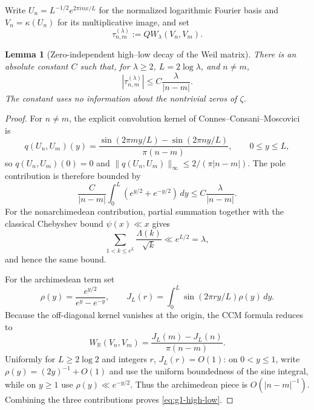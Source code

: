 \documentclass[11pt]{article}
\newtheorem{lemma}[theorem]{Lemma}
\theoremstyle{remark}
\begin{document}
Write $U_n=L^{-1/2}e^{2\pi inx/L}$ for the normalized logarithmic Fourier basis and $V_n=\kappa(U_n)$ for its multiplicative image, and set
\[
 \tau^{(\lambda)}_{n,m}:=QW_\lambda(V_n,V_m).
\]

\begin{lemma}[Zero-independent high--low decay of the Weil matrix]\label{lem:g1-high-low}
There is an absolute constant $C$ such that, for $\lambda\ge2$,
$L=2\log\lambda$, and $n\ne m$,
\begin{equation}\label{eq:g1-high-low}
 \boxed{
 |\tau^{(\lambda)}_{n,m}|
 \le C\frac{\lambda}{|n-m|}.}
\end{equation}
The constant uses no information about the nontrivial zeros of $\zeta$.
\end{lemma}
\begin{proof}
For $n\ne m$, the explicit convolution kernel of
Connes--Consani--Moscovici~\cite{ConnesConsaniMoscovici2025} is
\[
 q(U_n,U_m)(y)
 =\frac{\sin(2\pi my/L)-\sin(2\pi ny/L)}{\pi(n-m)},
 \qquad 0\le y\le L,
\]
so $q(U_n,U_m)(0)=0$ and
$\|q(U_n,U_m)\|_\infty\le 2/(\pi|n-m|)$.  The pole contribution is therefore
bounded by
\[
 \frac{C}{|n-m|}\int_0^L(e^{y/2}+e^{-y/2})\,dy
 \le C\frac{\lambda}{|n-m|}.
\]
For the nonarchimedean contribution, partial summation together with the
classical Chebyshev bound $\psi(x)\ll x$ gives
\[
 \sum_{1<k\le e^L}\frac{\Lambda(k)}{\sqrt{k}}
 \ll e^{L/2}=\lambda,
\]
and hence the same bound.

For the archimedean term set
\[
 \rho(y)=\frac{e^{y/2}}{e^y-e^{-y}},\qquad
 J_L(r)=\int_0^L\sin(2\pi r y/L)\rho(y)\,dy.
\]
Because the off-diagonal kernel vanishes at the origin, the CCM formula reduces
to
\[
 W_{\mathbb R}(V_n,V_m)
 =\frac{J_L(m)-J_L(n)}{\pi(n-m)}.
\]
Uniformly for $L\ge2\log2$ and integers $r$, $J_L(r)=O(1)$: on $0<y\le1$,
write $\rho(y)=(2y)^{-1}+O(1)$ and use the uniform boundedness of the sine
integral, while on $y\ge1$ use $\rho(y)\ll e^{-y/2}$.  Thus the archimedean
piece is $O(|n-m|^{-1})$.  Combining the three contributions proves
\eqref{eq:g1-high-low}.
\end{proof}
\end{document}
